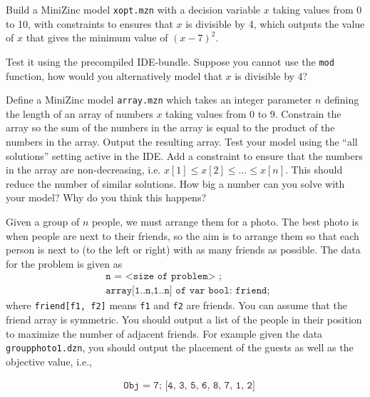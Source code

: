 \documentclass[a4paper,10pt,fleqn]{article}
\begin{document}
\kopfErsteSeite
\kopfAngabe


Build a MiniZinc model \texttt{xopt.mzn} with a decision variable $x$ taking values from 0 to 10, with
constraints to ensures that $x$ is divisible by 4, which outputs the value of $x$ that gives the minimum
value of $(x-7)^2$.

Test it using the precompiled IDE-bundle. Suppose you cannot use the \texttt{mod} function, how would you alternatively model that $x$
is divisible by 4?

Define a MiniZinc model \texttt{array.mzn} which takes an integer parameter $n$ defining the length of an
array of numbers $x$ taking values from 0 to 9. Constrain the array so the sum of the numbers in
the array is equal to the product of the numbers in the array. Output the resulting array.
Test your model using the ``all solutions'' setting active in the IDE. Add a constraint to ensure that the numbers in the array are non-decreasing, i.e. $x[1] \leq x[2] \leq
\ldots \leq x[n]$. This should reduce the number of similar solutions. 
How big a number can you solve with your model? Why do you think this happens?

Given a group of $n$ people, we must arrange them for a photo. The best
photo is when people are next to their friends, so the aim is to arrange them so that each person
is next to (to the left or right) with as many friends as possible. The data for the
problem is given as
%
\begin{align*}
& \texttt{n = <size of problem> ;} \\
& \texttt{array[1..n,1..n] of var bool: friend; }
\end{align*} 
%
where \texttt{friend[f1, f2]} means \texttt{f1} and \texttt{f2} are friends. You can assume that the friend array is symmetric.
You should output a list of the people in their position to maximize the number of adjacent
friends. For example given the data \texttt{groupphoto1.dzn}, you should output the placement of the guests as well as the objective value, i.e.,

\begin{align*}
& \texttt{Obj = 7; [4, 3, 5, 6, 8, 7, 1, 2]}
\end{align*}


\end{document}
